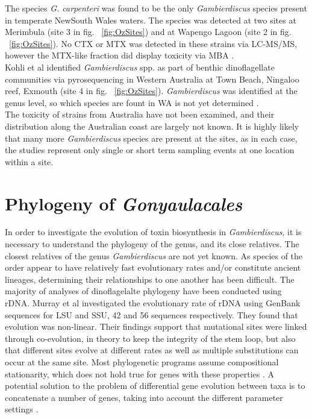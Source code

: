 \documentclass[12pt]{article}
\begin{document}
The species \emph{G. carpenteri} was found to be the only \emph{Gambierdiscus} species present in temperate NewSouth Wales waters. The species was detected at two sites at Merimbula (site 3 in fig. ~\ref{fig:OzSites}) and at Wapengo Lagoon (site 2 in fig. ~\ref{fig:OzSites}). No CTX or MTX was detected in these strains via LC-MS/MS, however the MTX-like fraction did display toxicity via MBA  \cite{kohli2014high}.\\ 

Kohli et al identified \emph{Gambierdiscus} spp. as part of benthic dinoflagellate communities via pyrosequencing in Western Australia at Town Beach, Ningaloo reef, Exmouth (site 4 in fig. ~\ref{fig:OzSites}).  \emph{Gambierdiscus} was identified at the genus level, so which species are fount in WA is not yet determined \cite{kohli2014cob}. \\

 The toxicity of strains from Australia have not been examined, and their distribution along the Australian coast are largely not known. It is highly likely that many more \emph{Gambierdiscus} species are present at the sites, as in each case, the studies represent only single or short term sampling events at one location within a site.


\section{Phylogeny of \emph{Gonyaulacales}}
In order to investigate the evolution of toxin biosynthesis in \textit{Gambierdiscus}, it is necessary to understand the phylogeny of the genus, and its close relatives. The closest relatives of the genus \textit{Gambierdiscus} are not yet known.  As species of the order appear to have relatively fast evolutionary rates and/or constitute ancient lineages, determining their relationships to one another has been difficult. The majority of analyses of dinoflagelalte phylogeny have been conducted using rDNA. Murray et al investigated the evolutionary rate of rDNA using GenBank sequences for LSU and SSU, 42 and 56 sequences respectively. They found that evolution was non-linear. Their findings support that mutational sites were linked through co-evolution, in theory to keep the integrity of the stem loop, but also that different sites evolve at different rates as well as multiple substitutions can occur at the same site. Most phylogenetic programs assume compositional stationarity, which does not hold true for genes with these properties \cite{murray2005improving}. A potential solution to the problem of differential gene evolution between taxa is to concatenate a number of genes, taking into account the different parameter settings \cite{gontcharov2004combined,pupko2002combining}.\\
\end{document}
